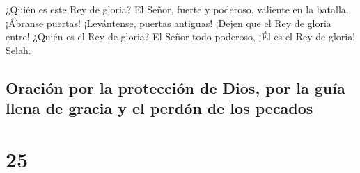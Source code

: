  ¿Quién es este Rey de gloria? El Señor, fuerte y
poderoso, valiente en la batalla.  ¡Ábranse puertas!
¡Levántense, puertas antiguas! ¡Dejen que el Rey de gloria entre!
 ¿Quién es el Rey de gloria? El Señor todo poderoso, ¡Él
es el Rey de gloria! Selah.

\hypertarget{oraciuxf3n-por-la-protecciuxf3n-de-dios-por-la-guuxeda-llena-de-gracia-y-el-perduxf3n-de-los-pecados}{%
\subsection{Oración por la protección de Dios, por la guía llena de
gracia y el perdón de los
pecados}\label{oraciuxf3n-por-la-protecciuxf3n-de-dios-por-la-guuxeda-llena-de-gracia-y-el-perduxf3n-de-los-pecados}}

\hypertarget{section-24}{%
\section{25}\label{section-24}}

